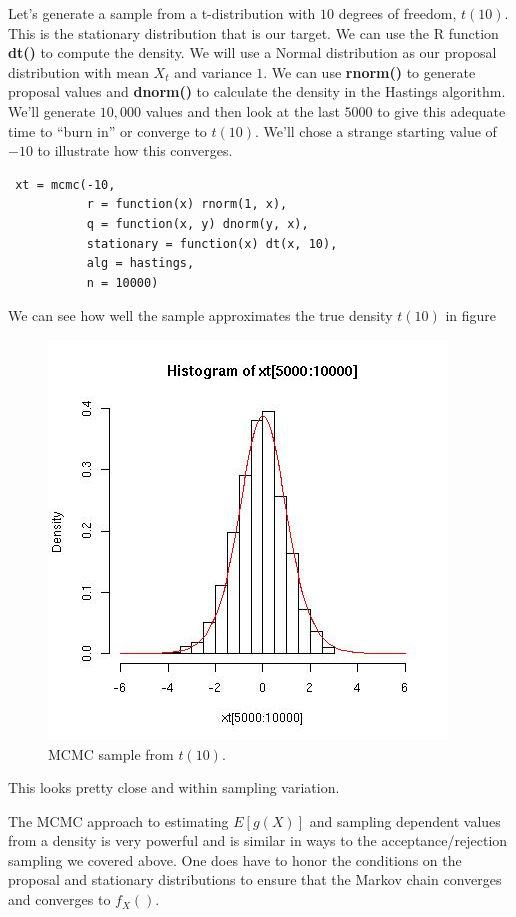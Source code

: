 \documentclass{article}
\def\SFunction#1{\textbf{#1()}}
\begin{document}
Let's generate a sample from a t-distribution with $10$ degrees of
freedom, $t(10)$.  This is the stationary distribution that is our
target.  We can use the R function \SFunction{dt} to compute the
density.  We will use a Normal distribution as our proposal
distribution with mean $X_t$ and variance $1$.  We can use
\SFunction{rnorm} to generate proposal values and \SFunction{dnorm} to
calculate the density in the Hastings algorithm.
We'll generate $10,000$ values and then look at the last
$5000$ to give this adequate time to ``burn in'' or converge
to $t(10)$. We'll chose a strange starting value of $-10$
to illustrate how this converges.
\begin{verbatim}
 xt = mcmc(-10, 
           r = function(x) rnorm(1, x), 
           q = function(x, y) dnorm(y, x), 
           stationary = function(x) dt(x, 10), 
           alg = hastings, 
           n = 10000)
\end{verbatim}
We can see how well the sample approximates the
true density $t(10)$ in figure
\begin{figure}[htbp]
  \begin{center}
    \leavevmode
    \includegraphics{mcmcT10.jpg}
    \caption{MCMC sample from $t(10)$.}
    \label{fig:mcmcT10.jpg}
  \end{center}
\end{figure}
This looks pretty close and within sampling variation.


The MCMC  approach to estimating $E[g(X)]$ and sampling dependent
values from a density is very powerful and is similar in ways to the
acceptance/rejection sampling we covered above.  One does have to
honor the conditions on the proposal and stationary distributions to
ensure that the Markov chain converges and converges to $f_X()$.
\end{document}
